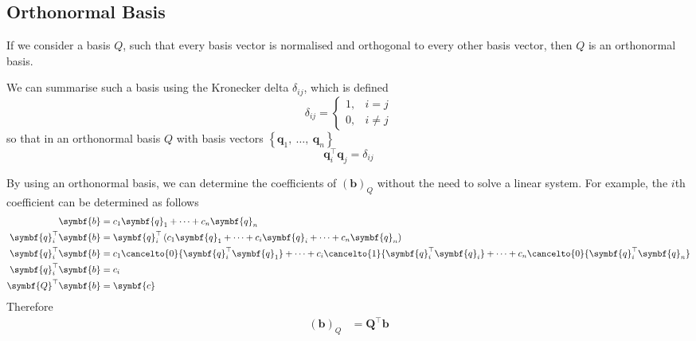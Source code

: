 \documentclass{article}
\begin{document}
\subsection{Orthonormal Basis}
If we consider a basis \(Q\), such that every basis vector is
normalised and orthogonal to every other basis vector, then \(Q\) is an
orthonormal basis.
\begin{definition}
    We can summarise such a basis using the Kronecker delta \(\delta_{ij}\),
    which is defined
    \begin{equation*}
        \delta_{ij} =
        \begin{cases}
            1, & i = j   \\
            0, & i \ne j
        \end{cases}
    \end{equation*}
    so that in an orthonormal basis \(Q\) with basis vectors
    \(\left\{ \symbf{q}_1,\: \dots,\: \symbf{q}_n \right\}\)
    \begin{equation*}
        \symbf{q}_i^\top \symbf{q}_j = \delta_{ij}
    \end{equation*}
\end{definition}
By using an orthonormal basis, we can determine the coefficients of \(\left( \symbf{b} \right)_Q\) without
the need to solve a linear system. For example, the \(i\)th coefficient can be determined as
follows
\begin{align*}
    \symbf{b}                  & = c_1 \symbf{q}_1 + \cdots + c_n \symbf{q}_n                                                                                                                         \\
    \symbf{q}_i^\top \symbf{b} & = \symbf{q}_i^\top \left( c_1 \symbf{q}_1 + \cdots + c_i \symbf{q}_i + \cdots + c_n \symbf{q}_n \right)                                                              \\
    \symbf{q}_i^\top \symbf{b} & = c_1 \cancelto{0}{\symbf{q}_i^\top \symbf{q}_1} + \cdots + c_i \cancelto{1}{\symbf{q}_i^\top \symbf{q}_i} + \cdots + c_n \cancelto{0}{\symbf{q}_i^\top \symbf{q}_n} \\
    \symbf{q}_i^\top \symbf{b} & = c_i                                                                                                                                                                \\
    \symbf{Q}^\top \symbf{b}   & = \symbf{c}
\end{align*}
Therefore
\begin{align*}
    \left( \symbf{b} \right)_Q & = \symbf{Q}^\top \symbf{b}
\end{align*}
\end{document}
